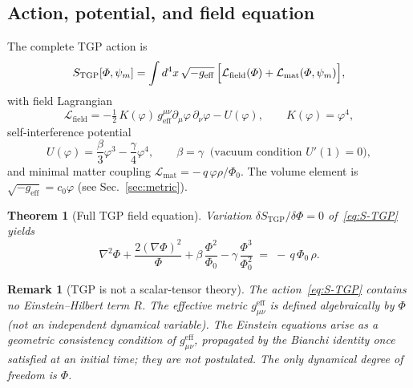 \documentclass[11pt,a4paper]{article}
\renewcommand{\Phi}{\varPhi}
\newcommand{\PhiZero}{\varPhi_{0}}
\newtheorem{theorem}[axiom]{Theorem}
\newtheorem{remark}[axiom]{Remark}
\begin{document}
\subsection{Action, potential, and field equation}

The complete TGP action is
\begin{equation}\label{eq:S-TGP}
  S_{\mathrm{TGP}}[\Phi,\psi_{m}]
  =\int d^{4}x\,\sqrt{-g_{\mathrm{eff}}}\,
    \Bigl[\mathcal{L}_{\mathrm{field}}(\Phi)
    +\mathcal{L}_{\mathrm{mat}}(\Phi,\psi_{m})\Bigr],
\end{equation}
with field Lagrangian
\begin{equation}\label{eq:L-field}
  \mathcal{L}_{\mathrm{field}}
  =-\tfrac{1}{2}\,K(\varphi)\,
    g_{\mathrm{eff}}^{\mu\nu}\partial_{\mu}\varphi\,\partial_{\nu}\varphi
  - U(\varphi),
  \qquad K(\varphi)=\varphi^{4},
\end{equation}
self-interference potential
\begin{equation}\label{eq:U-potential}
  U(\varphi)
  =\frac{\beta}{3}\varphi^{3}-\frac{\gamma}{4}\varphi^{4},
  \qquad \beta=\gamma
  \;\;\text{(vacuum condition $U'(1)=0$)},
\end{equation}
and minimal matter coupling
$\mathcal{L}_{\mathrm{mat}}=-\,q\,\varphi\rho/\PhiZero$. The volume element
is $\sqrt{-g_{\mathrm{eff}}}=c_{0}\varphi$ (see Sec.~\ref{sec:metric}).

\begin{theorem}[Full TGP field equation]\label{thm:field-eq}
Variation $\delta S_{\mathrm{TGP}}/\delta\Phi=0$ of~\eqref{eq:S-TGP} yields
\begin{equation}\label{eq:field-eq}
  \boxed{\;
    \nabla^{2}\Phi
    +\frac{2(\nabla\Phi)^{2}}{\Phi}
    +\beta\,\frac{\Phi^{2}}{\PhiZero}
    -\gamma\,\frac{\Phi^{3}}{\PhiZero^{2}}
    \;=\;-\,q\,\PhiZero\,\rho.
  \;}
\end{equation}
\end{theorem}

\begin{remark}[TGP is not a scalar-tensor theory]\label{rem:not-ST}
The action~\eqref{eq:S-TGP} contains \emph{no} Einstein--Hilbert term $R$.
The effective metric $g_{\mu\nu}^{\mathrm{eff}}$ is defined algebraically
by $\Phi$ (not an independent dynamical variable). The Einstein equations
arise as a geometric consistency condition of $g_{\mu\nu}^{\mathrm{eff}}$,
propagated by the Bianchi identity once satisfied at an initial time; they
are not postulated. The only dynamical degree of freedom is $\Phi$.
\end{remark}
\end{document}
